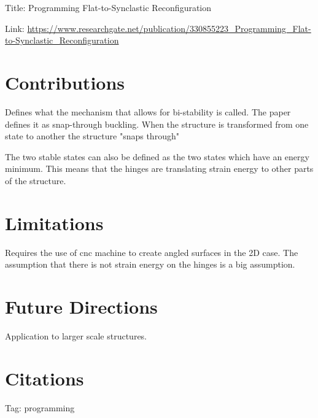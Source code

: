 \documentclass{article}
\begin{document}
    
Title: Programming Flat-to-Synclastic Reconfiguration

Link: \url{https://www.researchgate.net/publication/330855223_Programming_Flat-to-Synclastic_Reconfiguration}

\section*{Contributions}
Defines what the mechanism that allows for bi-stability is called. The paper defines it
as snap-through buckling. When the structure is transformed from one state to another
the structure "snaps through"

The two stable states can also be defined as the two states which have an energy minimum. 
This means that the hinges are translating strain energy to other parts of the structure. 

\section*{Limitations}
Requires the use of cnc machine to create angled surfaces in the 2D case. The assumption 
that there is not strain energy on the hinges is a big assumption. 

\section*{Future Directions}
Application to larger scale structures. 



\section*{Citations}


Tag: programming
\cite{programming}
\end{document}
